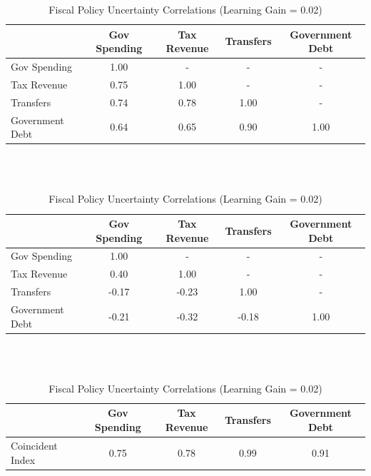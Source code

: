 \documentclass[11pt]{article}
\begin{document}
\newpage

\begin{table}[t]\caption{Fiscal Policy Uncertainty Correlations (Learning Gain = 0.02)}\label{tb:fpucorrel0.02}
\begin{center}
\begin{tabular}{l|cccc}
 & Gov Spending & Tax Revenue & Transfers & Government Debt \\ \hline
Gov Spending & 1.00 & - & - & - \\
Tax Revenue & 0.75 & 1.00 & - & - \\
Transfers & 0.74 & 0.78 & 1.00 & - \\
Government Debt & 0.64 & 0.65 & 0.90 & 1.00 \\ \hline
\end{tabular}

\ \\ \ \\

\begin{tabular}{l|cccc}
 & Gov Spending & Tax Revenue & Transfers & Government Debt \\ \hline
Gov Spending & 1.00 & - & - & - \\
Tax Revenue & 0.40 & 1.00 & - & - \\
Transfers & -0.17 & -0.23 & 1.00 & - \\
Government Debt & -0.21 & -0.32 & -0.18 & 1.00 \\ \hline
\end{tabular}

\ \\ \ \\

\begin{tabular}{l|cccc}
 & Gov Spending & Tax Revenue & Transfers & Government Debt \\ \hline
Coincident Index~ & 0.75 & 0.78 & 0.99 & 0.91 \\ \hline
\end{tabular}

\end{center}
\end{table}




\end{document}
